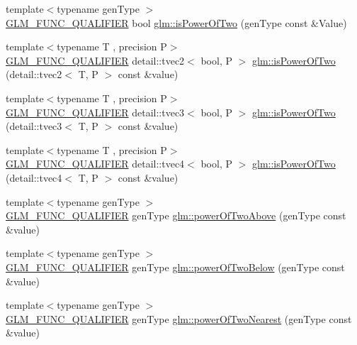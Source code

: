 \begin{DoxyCompactItemize}
\item 
{\footnotesize template$<$typename gen\+Type $>$ }\\\hyperlink{setup_8hpp_a33fdea6f91c5f834105f7415e2a64407}{G\+L\+M\+\_\+\+F\+U\+N\+C\+\_\+\+Q\+U\+A\+L\+I\+F\+I\+ER} bool \hyperlink{group__gtx__bit_ga5ddca7546d8be35992eedd3411842545}{glm\+::is\+Power\+Of\+Two} (gen\+Type const \&Value)
\item 
{\footnotesize template$<$typename T , precision P$>$ }\\\hyperlink{setup_8hpp_a33fdea6f91c5f834105f7415e2a64407}{G\+L\+M\+\_\+\+F\+U\+N\+C\+\_\+\+Q\+U\+A\+L\+I\+F\+I\+ER} detail\+::tvec2$<$ bool, P $>$ \hyperlink{namespaceglm_a9a3caa0a27cd099623517846f6ae1d23}{glm\+::is\+Power\+Of\+Two} (detail\+::tvec2$<$ T, P $>$ const \&value)
\item 
{\footnotesize template$<$typename T , precision P$>$ }\\\hyperlink{setup_8hpp_a33fdea6f91c5f834105f7415e2a64407}{G\+L\+M\+\_\+\+F\+U\+N\+C\+\_\+\+Q\+U\+A\+L\+I\+F\+I\+ER} detail\+::tvec3$<$ bool, P $>$ \hyperlink{namespaceglm_afd117094f8c3507a5fa6598be1f089c1}{glm\+::is\+Power\+Of\+Two} (detail\+::tvec3$<$ T, P $>$ const \&value)
\item 
{\footnotesize template$<$typename T , precision P$>$ }\\\hyperlink{setup_8hpp_a33fdea6f91c5f834105f7415e2a64407}{G\+L\+M\+\_\+\+F\+U\+N\+C\+\_\+\+Q\+U\+A\+L\+I\+F\+I\+ER} detail\+::tvec4$<$ bool, P $>$ \hyperlink{namespaceglm_a071c03cdef9f44cac492f572b218c42c}{glm\+::is\+Power\+Of\+Two} (detail\+::tvec4$<$ T, P $>$ const \&value)
\item 
{\footnotesize template$<$typename gen\+Type $>$ }\\\hyperlink{setup_8hpp_a33fdea6f91c5f834105f7415e2a64407}{G\+L\+M\+\_\+\+F\+U\+N\+C\+\_\+\+Q\+U\+A\+L\+I\+F\+I\+ER} gen\+Type \hyperlink{group__gtx__bit_gaa49786cf3f8a1f65de6e70b6088a811e}{glm\+::power\+Of\+Two\+Above} (gen\+Type const \&value)
\item 
{\footnotesize template$<$typename gen\+Type $>$ }\\\hyperlink{setup_8hpp_a33fdea6f91c5f834105f7415e2a64407}{G\+L\+M\+\_\+\+F\+U\+N\+C\+\_\+\+Q\+U\+A\+L\+I\+F\+I\+ER} gen\+Type \hyperlink{group__gtx__bit_gaeceaea338213cbff7a275460e35e8d0c}{glm\+::power\+Of\+Two\+Below} (gen\+Type const \&value)
\item 
{\footnotesize template$<$typename gen\+Type $>$ }\\\hyperlink{setup_8hpp_a33fdea6f91c5f834105f7415e2a64407}{G\+L\+M\+\_\+\+F\+U\+N\+C\+\_\+\+Q\+U\+A\+L\+I\+F\+I\+ER} gen\+Type \hyperlink{group__gtx__bit_ga9e68299f4ca0cd6674efbee62d425b95}{glm\+::power\+Of\+Two\+Nearest} (gen\+Type const \&value)

\end{DoxyCompactItemize}
